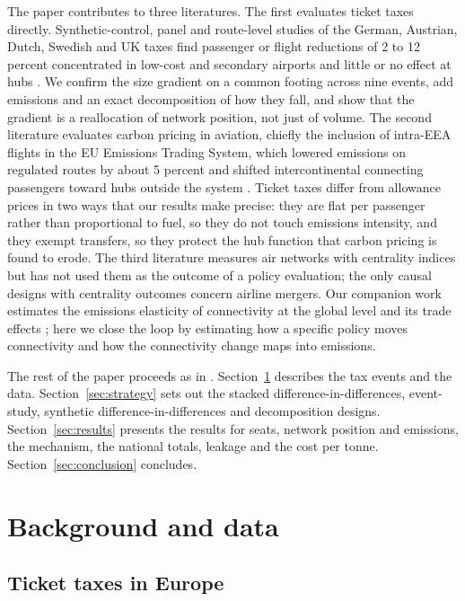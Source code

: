 The paper contributes to three literatures. The first evaluates ticket taxes directly. Synthetic-control,
panel and route-level studies of the German, Austrian, Dutch, Swedish and UK taxes find passenger or
flight reductions of 2 to 12 percent concentrated in low-cost and secondary airports and little or no
effect at hubs \citep{borbely2019,falk2019,bernardo2024flight,oesingmann2022,seetaram2014,gordijn2011}.
We confirm the size gradient on a common footing across nine events, add emissions and an exact
decomposition of how they fall, and show that the gradient is a reallocation of network position, not
just of volume. The second literature evaluates carbon pricing in aviation, chiefly the inclusion of
intra-EEA flights in the EU Emissions Trading System, which lowered emissions on regulated routes by
about 5 percent \citep{fageda2022pricing} and shifted intercontinental connecting passengers toward
hubs outside the system \citep{fageda2025hub}. Ticket taxes differ from allowance prices in two ways
that our results make precise: they are flat per passenger rather than proportional to fuel, so they do
not touch emissions intensity, and they exempt transfers, so they protect the hub function that carbon
pricing is found to erode. The third literature measures air networks with centrality indices
\citep{cheung2020} but has not used them as the outcome of a policy evaluation; the only causal designs
with centrality outcomes concern airline mergers. Our companion work estimates the emissions elasticity
of connectivity at the global level \citep{yoo2026co2} and its trade effects \citep{yoo2026trade}; here
we close the loop by estimating how a specific policy moves connectivity and how the connectivity
change maps into emissions.

The rest of the paper proceeds as in \citet{li2019subway}. Section~\ref{sec:background} describes the
tax events and the data. Section~\ref{sec:strategy} sets out the stacked difference-in-differences,
event-study, synthetic difference-in-differences and decomposition designs. Section~\ref{sec:results}
presents the results for seats, network position and emissions, the mechanism, the national totals,
leakage and the cost per tonne. Section~\ref{sec:conclusion} concludes.

\section{Background and data}
\label{sec:background}

\subsection{Ticket taxes in Europe}

